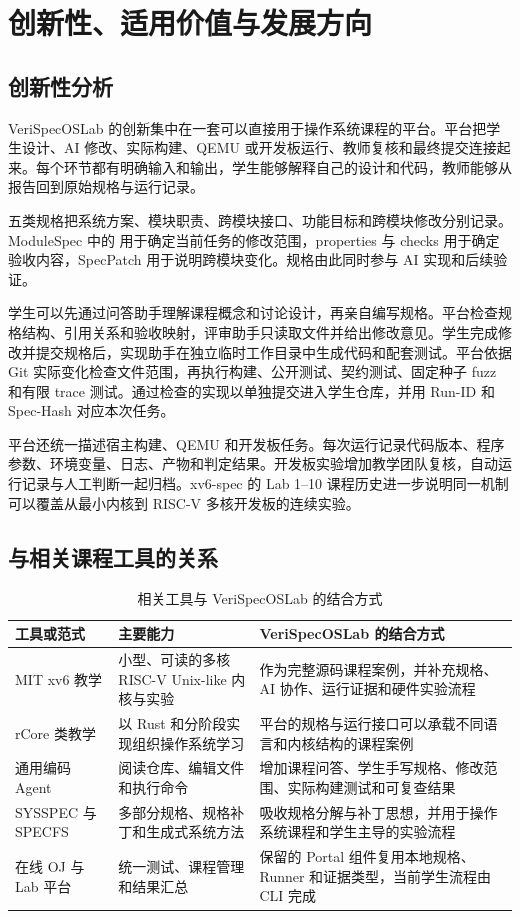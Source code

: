 \chapter{创新性、适用价值与发展方向}

\section{创新性分析}

VeriSpecOSLab 的创新集中在一套可以直接用于操作系统课程的平台。平台把学生设计、AI 修改、实际构建、QEMU 或开发板运行、教师复核和最终提交连接起来。每个环节都有明确输入和输出，学生能够解释自己的设计和代码，教师能够从报告回到原始规格与运行记录。

五类规格把系统方案、模块职责、跨模块接口、功能目标和跨模块修改分别记录。ModuleSpec 中的  用于确定当前任务的修改范围，properties 与 checks 用于确定验收内容，SpecPatch 用于说明跨模块变化。规格由此同时参与 AI 实现和后续验证。

学生可以先通过问答助手理解课程概念和讨论设计，再亲自编写规格。平台检查规格结构、引用关系和验收映射，评审助手只读取文件并给出修改意见。学生完成修改并提交规格后，实现助手在独立临时工作目录中生成代码和配套测试。平台依据 Git 实际变化检查文件范围，再执行构建、公开测试、契约测试、固定种子 fuzz 和有限 trace 测试。通过检查的实现以单独提交进入学生仓库，并用 Run-ID 和 Spec-Hash 对应本次任务。

平台还统一描述宿主构建、QEMU 和开发板任务。每次运行记录代码版本、程序参数、环境变量、日志、产物和判定结果。开发板实验增加教学团队复核，自动运行记录与人工判断一起归档。xv6-spec 的 Lab 1--10 课程历史进一步说明同一机制可以覆盖从最小内核到 RISC-V 多核开发板的连续实验。

\section{与相关课程工具的关系}

\begin{table}[htbp]
  \centering
  \caption{相关工具与 VeriSpecOSLab 的结合方式}
  \begin{tabularx}{\textwidth}{p{3cm}p{4.1cm}X}
    \toprule
    工具或范式 & 主要能力 & VeriSpecOSLab 的结合方式 \\
    \midrule
    MIT xv6 教学 & 小型、可读的多核 RISC-V Unix-like 内核与实验 & 作为完整源码课程案例，并补充规格、AI 协作、运行证据和硬件实验流程 \\
    rCore 类教学 & 以 Rust 和分阶段实现组织操作系统学习 & 平台的规格与运行接口可以承载不同语言和内核结构的课程案例 \\
    通用编码 Agent & 阅读仓库、编辑文件和执行命令 & 增加课程问答、学生手写规格、修改范围、实际构建测试和可复查结果 \\
    SYSSPEC 与 SPECFS & 多部分规格、规格补丁和生成式系统方法 & 吸收规格分解与补丁思想，并用于操作系统课程和学生主导的实验流程 \\
    在线 OJ 与 Lab 平台 & 统一测试、课程管理和结果汇总 & 保留的 Portal 组件复用本地规格、Runner 和证据类型，当前学生流程由 CLI 完成 \\
    \bottomrule
  \end{tabularx}
\end{table}

